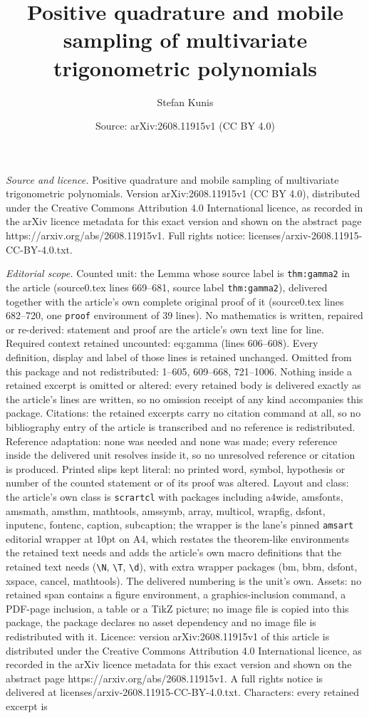 \documentclass[10pt,a4paper]{amsart}
\title[Positive quadrature and mobile sampling of multivariate trig]{Positive quadrature and mobile sampling of multivariate trigonometric polynomials}
\author{Stefan Kunis}
\date{Source: arXiv:2608.11915v1 (CC BY 4.0)}
\begin{document}
\maketitle

\noindent\emph{Source and licence.} Positive quadrature and mobile sampling of multivariate trigonometric polynomials. Version arXiv:2608.11915v1 (CC BY 4.0), distributed under the Creative Commons Attribution 4.0 International licence, as recorded in the arXiv licence metadata for this exact version and shown on the abstract page https://arxiv.org/abs/2608.11915v1. Full rights notice: licenses/arxiv-2608.11915-CC-BY-4.0.txt.\par\smallskip

\noindent\textit{Editorial scope.} Counted unit: the Lemma whose source label is \texttt{thm:gamma2} in the article (source0.tex lines 669--681, source label \texttt{thm:gamma2}), delivered together with the article's own complete original proof of it (source0.tex lines 682--720, one \texttt{proof} environment of 39 lines). No mathematics is written, repaired or re-derived: statement and proof are the article's own text line for line. Required context retained uncounted: eq:gamma (lines 606--608). Every definition, display and label of those lines is retained unchanged. Omitted from this package and not redistributed: 1--605, 609--668, 721--1006. Nothing inside a retained excerpt is omitted or altered: every retained body is delivered exactly as the article's lines are written, so no omission receipt of any kind accompanies this package. Citations: the retained excerpts carry no citation command at all, so no bibliography entry of the article is transcribed and no reference is redistributed. Reference adaptation: none was needed and none was made; every reference inside the delivered unit resolves inside it, so no unresolved reference or citation is produced. Printed slips kept literal: no printed word, symbol, hypothesis or number of the counted statement or of its proof was altered. Layout and class: the article's own class is \texttt{scrartcl} with packages including a4wide, amsfonts, amsmath, amsthm, mathtools, amssymb, array, multicol, wrapfig, dsfont, inputenc, fontenc, caption, subcaption; the wrapper is the lane's pinned \texttt{amsart} editorial wrapper at 10pt on A4, which restates the theorem-like environments the retained text needs and adds the article's own macro definitions that the retained text needs (\texttt{\textbackslash N}, \texttt{\textbackslash T}, \texttt{\textbackslash d}), with extra wrapper packages (bm, bbm, dsfont, xspace, cancel, mathtools). The delivered numbering is the unit's own. Assets: no retained span contains a figure environment, a graphics-inclusion command, a PDF-page inclusion, a table or a TikZ picture; no image file is copied into this package, the package declares no asset dependency and no image file is redistributed with it. Licence: version arXiv:2608.11915v1 of this article is distributed under the Creative Commons Attribution 4.0 International licence, as recorded in the arXiv licence metadata for this exact version and shown on the abstract page https://arxiv.org/abs/2608.11915v1. A full rights notice is delivered at licenses/arxiv-2608.11915-CC-BY-4.0.txt. Characters: every retained excerpt is 
\end{document}
